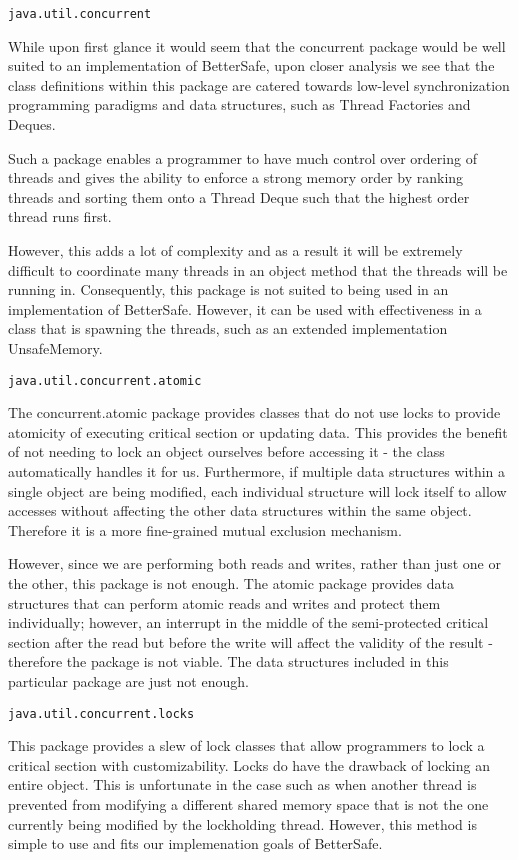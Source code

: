 \begin{verbatim}
java.util.concurrent
\end{verbatim}
While upon first glance it would seem that the concurrent package would be well suited to an implementation of 
BetterSafe, upon closer analysis we see that the class definitions within this package are catered towards low-level synchronization
programming paradigms and data structures, such as Thread Factories and Deques.

Such a package enables a programmer to have much control over ordering of threads and gives the ability to enforce a strong
memory order by ranking threads and sorting them onto a Thread Deque such that the highest order thread runs first.

However, this adds a lot of complexity and as a result it will be extremely difficult to coordinate many threads in an object method
that the threads will be running in. Consequently, this package is not suited to being used in an implementation of BetterSafe. However, it can be
used with effectiveness in a class that is spawning the threads, such as an extended implementation UnsafeMemory.

\begin{verbatim}
java.util.concurrent.atomic
\end{verbatim}
The concurrent.atomic package provides classes that do not use locks to provide atomicity of executing critical section or updating data.
This provides the benefit of not needing to lock an object ourselves before accessing it - the class automatically handles it for us. Furthermore, if
multiple data structures within a single object are being modified, each individual structure will lock itself to allow accesses without affecting the other
data structures within the same object. Therefore it is a more fine-grained mutual exclusion mechanism.

However, since we are performing both reads and writes, rather than just one or the other, this package is not enough. The atomic package provides data structures that can perform atomic reads and writes and protect them
individually; however, an interrupt in the middle of the semi-protected critical section after the read but before the write will affect the validity of the result - therefore the 
package is not viable. The data structures included in this particular package are just not enough.

\begin{verbatim}
java.util.concurrent.locks
\end{verbatim}
This package provides a slew of lock classes that allow programmers to lock a critical section with customizability. Locks do have the drawback of locking an entire object. This is unfortunate in the case such as when another thread
is prevented from modifying a different shared memory space that is not the one currently being modified by the lockholding thread. However, this method is simple to use and fits our implemenation goals of BetterSafe.

